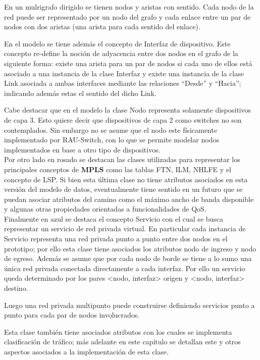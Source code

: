 \newpage
En un mulrigrafo dirigido se tienen nodos y aristas con sentido. Cada nodo de la red puede ser representado por un nodo del grafo y cada enlace entre un par de nodos con dos aristas (una arista para cada sentido del enlace).

En el modelo se tiene adem\'as el concepto de Interfaz de dispositivo. Este concepto re-define la noción de adyacencia entre dos nodos en el grafo de la siguiente forma: existe una arista para un par de nodos si cada uno de ellos est\'a asociado a una instancia de la clase Interfaz y existe una instancia de la clase Link asociada a ambas interfaces mediante las relaciones “Desde” y “Hacia”; indicando adem\'as estas el sentido del dicho Link.

Cabe destacar que en el modelo la clase Nodo representa solamente dispositivos de capa 3. Esto quiere decir que dispositivos de capa 2 como switches no son contemplados. Sin embargo no se asume que el nodo este f\'isicamente implementado por RAU-Switch, con lo que se permite modelar nodos implementados en base a otro tipo de dispositivos.\\

Por otro lado en rosado se destacan las clases utilizadas para representar los principales conceptos de \textbf{MPLS} como las tablas FTN, ILM, NHLFE y el concepto de LSP. Si bien esta \'ultima clase no tiene atributos asociados en esta versi\'on del modelo de datos, eventualmente tiene sentido en un futuro que se puedan asociar atributos del camino como el m\'aximo ancho de banda disponible y algunas otras propiedades orientadas a funcionalidades de QoS.\\

Finalmente en azul se destaca el concepto Servicio con el cual se busca representar un servicio de red privada virtual. En particular cada instancia de Servicio representa una red privada punto a punto entre dos nodos en el prototipo; por ello esta clase tiene asociados los atributos nodo de ingreso y nodo de egreso. Adem\'as se asume que por cada nodo de borde se tiene a lo sumo una \'unica red privada conectada directamente a cada interfaz. Por ello un servicio queda determinado por los pares <nodo, interfaz> origen y <nodo, interfaz> destino. 

Luego una red privada multipunto puede construirse definiendo servicios punto a punto para cada par de nodos involucrados.

Esta clase también tiene asociados atributos con los cuales se implementa clasificaci\'on de tr\'afico; m\'as adelante en este cap\'itulo se detallan este y otros aspectos asociados a la implementaci\'on de esta clase.\\

